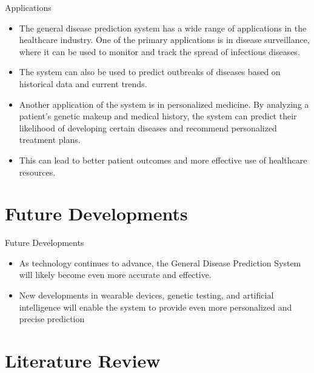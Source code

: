 \documentclass{SKP-beamer}
\begin{document}
\begin{frame}{Applications}
	\begin{itemize}
		\item The general disease prediction system has a wide range of applications in the healthcare industry. One of the primary applications is in disease surveillance, where it can be used to monitor and track the spread of infectious diseases. 
		\item The system can also be used to predict outbreaks of diseases based on historical data and current trends.
		\item Another application of the system is in personalized medicine. By analyzing a patient's genetic makeup and medical history, the system can predict their likelihood of developing certain diseases and recommend personalized treatment plans. 
		\item This can lead to better patient outcomes and more effective use of healthcare resources.
	\end{itemize}
\end{frame}


\section{\textbf{Future Developments}}

\begin{frame}{Future Developments}
	\begin{itemize}
	\item As technology continues to advance, the General Disease Prediction System will likely become even more accurate and effective.
	\item New developments in wearable devices, genetic testing, and artificial intelligence will enable the system to provide even more personalized and precise prediction
    \end{itemize}
\end{frame}

\section{\textbf{Literature Review}}
\end{document}
